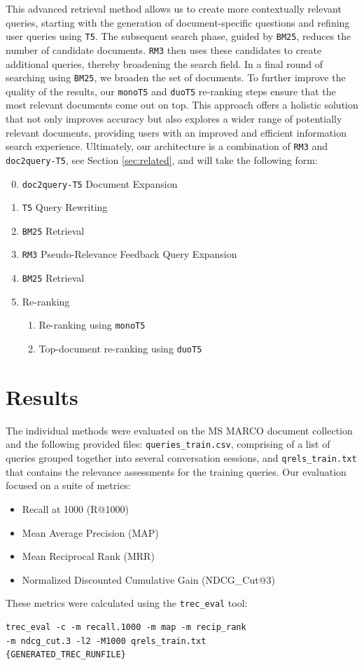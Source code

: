 \documentclass[sigconf]{acmart}
\begin{document}
This advanced retrieval method allows us to create more contextually relevant queries, starting with the generation of document-specific questions and refining user queries using \texttt{T5}. The subsequent search phase, guided by \texttt{BM25}, reduces the number of candidate documents. \texttt{RM3} then uses these candidates to create additional queries, thereby broadening the search field. In a final round of searching using \texttt{BM25}, we broaden the set of documents. To further improve the quality of the results, our \texttt{monoT5} and \texttt{duoT5} re-ranking steps ensure that the most relevant documents come out on top. This approach offers a holistic solution that not only improves accuracy but also explores a wider range of potentially relevant documents, providing users with an improved and efficient information search experience. Ultimately, our architecture is a combination of \texttt{RM3} and \texttt{doc2query-T5}, see Section \ref{sec:related}, and will take the following form:
\begin{enumerate}
	\setcounter{enumi}{-1}
	\item	\texttt{doc2query-T5} Document Expansion
	\item	\texttt{T5} Query Rewriting
	\item	\texttt{BM25} Retrieval
	\item	\texttt{RM3} Pseudo-Relevance Feedback Query Expansion
	\item	\texttt{BM25} Retrieval
	\item	Re-ranking
			\begin{enumerate}
				\item	Re-ranking using \texttt{monoT5}
				\item	Top-document re-ranking using \texttt{duoT5}
			\end{enumerate}
\end{enumerate}

\section{Results}\label{sec:results}
The individual methods were evaluated on the MS MARCO document collection and the following provided files: \texttt{queries\-\_\-train\-.csv}, comprising of a list of queries grouped together into several conversation sessions, and \texttt{qrels\-\_\-train\-.txt} that contains the relevance assessments for the training queries. Our evaluation focused on a suite of metrics:
\begin{itemize}
	\item	Recall at 1000 (R@1000)
	\item	Mean Average Precision (MAP)
	\item	Mean Reciprocal Rank (MRR)
	\item	Normalized Discounted Cumulative Gain (NDCG\_Cut@3)
\end{itemize}
These metrics were calculated using the \texttt{trec\_eval} tool:
\begin{verbatim}
trec_eval -c -m recall.1000 -m map -m recip_rank
-m ndcg_cut.3 -l2 -M1000 qrels_train.txt
{GENERATED_TREC_RUNFILE}
\end{verbatim}
\end{document}
